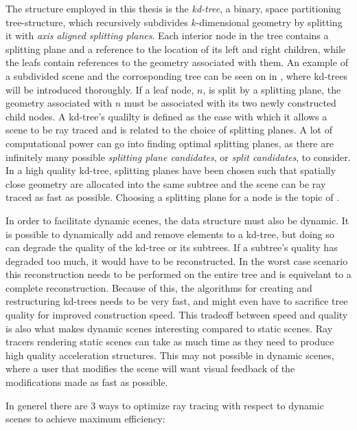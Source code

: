 The structure employed in this thesis is the \textit{kd-tree}, a binary, space
partitioning tree-structure, which recursively subdivides $k$-dimensional
geometry by splitting it with \textit{axis aligned splitting planes}. Each
interior node in the tree contains a splitting plane and a reference to the
location of its left and right children, while the leafs contain references to
the geometry associated with them. An example of a subdivided scene and the
corrosponding tree can be seen on  in
, where kd-trees will be introduced thoroughly. If a
leaf node, $n$, is split by a splitting plane, the geometry associated with $n$
must be associated with its two newly constructed child nodes. A kd-tree's
qualilty is defined as the ease with which it allows a scene to be ray traced
and is related to the choice of splitting planes. A lot of computational power
can go into finding optimal splitting planes, as there are infinitely many
possible \textit{splitting plane candidates}, or \textit{split candidates}, to
consider. In a high quality kd-tree, splitting planes have been chosen such that
spatially close geometry are allocated into the same subtree and the scene can
be ray traced as fast as possible. Choosing a splitting plane for a node is the
topic of .

In order to facilitate dynamic scenes, the data structure must also be
dynamic. It is possible to dynamically add and remove elements to a kd-tree, but
doing so can degrade the quality of the kd-tree or its subtrees. If a subtree's
quality has degraded too much, it would have to be reconstructed. In the worst
case scenario this reconstruction needs to be performed on the entire tree and
is equivelant to a complete reconstruction. Because of this, the algorithms for
creating and restructuring kd-trees needs to be very fast, and might even have
to sacrifice tree quality for improved construction speed. This tradeoff between
speed and quality is also what makes dynamic scenes interesting compared to
static scenes. Ray tracers rendering static scenes can take as much time as they
need to produce high quality acceleration structures. This may not possible in
dynamic scenes, where a user that modifies the scene will want visual feedback
of the modifications made as fast as possible.

In generel there are 3 ways to optimize ray tracing with respect to dynamic
scenes to achieve maximum efficiency:

